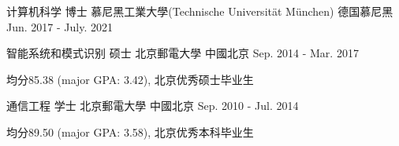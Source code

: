 



\begin{cventries}

\cventry
{计算机科学 博士} %
{慕尼黑工業大學(Technische Universität München)} %
{德国慕尼黑} %
{Jun. 2017 - July. 2021} %
{ %
}


\cventry
{智能系统和模式识别 硕士} %
{北京郵電大學} %
{中國北京} %
{Sep. 2014 - Mar. 2017} %
{ %
\begin{cvitems}
\item {均分85.38 (major GPA: 3.42), 北京优秀硕士毕业生}
\end{cvitems}
}


\cventry
{通信工程 学士} %
{北京郵電大學} %
{中國北京} %
{Sep. 2010 - Jul. 2014} %
{ %
\begin{cvitems}
\item {均分89.50 (major GPA: 3.58), 北京优秀本科毕业生}
\end{cvitems}
}%

\end{cventries}

